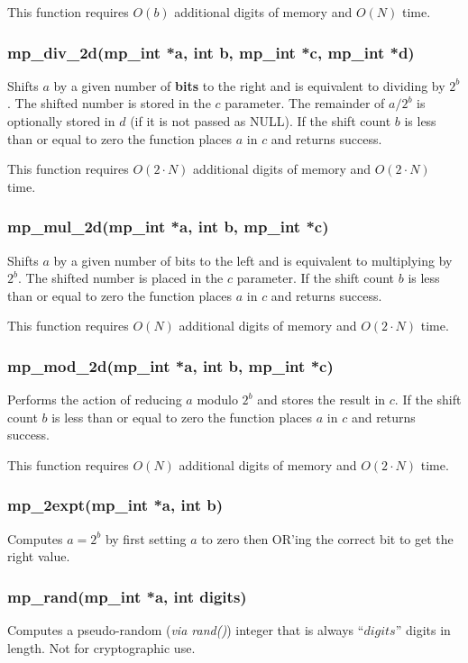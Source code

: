 \documentclass{article}
\begin{document}
This function requires $O(b)$ additional digits of memory and $O(N)$ time.

\subsubsection{mp\_div\_2d(mp\_int *a, int b, mp\_int *c, mp\_int *d)}
Shifts $a$ by a given number of \textbf{bits} to the right and is equivalent to dividing by $2^b$.  The shifted number is stored
in the $c$ parameter.  The remainder of $a/2^b$ is optionally stored in $d$ (if it is not passed as NULL).  
If the shift count $b$ is less than or equal to zero the function places $a$ in $c$ and returns success.  

This function requires $O(2 \cdot N)$ additional digits of memory and $O(2 \cdot N)$ time.

\subsubsection{mp\_mul\_2d(mp\_int *a, int b, mp\_int *c)}
Shifts $a$ by a given number of bits to the left and is equivalent to multiplying by $2^b$.  The shifted number
is placed in the $c$ parameter.  If the shift count $b$ is less than or equal to zero the function places $a$
in $c$ and returns success.  

This function requires $O(N)$ additional digits of memory and $O(2 \cdot N)$ time.

\subsubsection{mp\_mod\_2d(mp\_int *a, int b, mp\_int *c)}
Performs the action of reducing $a$ modulo $2^b$ and stores the result in $c$.  If the shift count $b$ is less than 
or equal to zero the function places $a$ in $c$ and returns success.  

This function requires $O(N)$ additional digits of memory and $O(2 \cdot N)$ time.

\subsubsection{mp\_2expt(mp\_int *a, int b)}
Computes $a = 2^b$ by first setting $a$ to zero then OR'ing the correct bit to get the right value.

\subsubsection{mp\_rand(mp\_int *a, int digits)}
Computes a pseudo-random (\textit{via rand()}) integer that is always ``$digits$'' digits in length.  Not for
cryptographic use.
\end{document}
